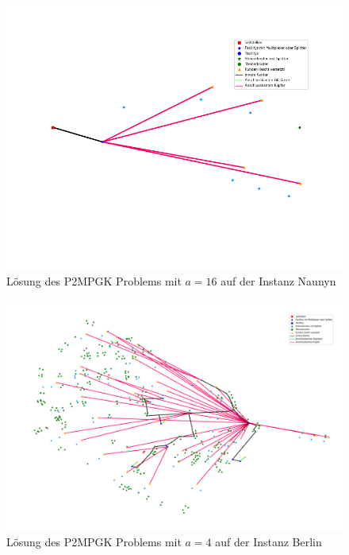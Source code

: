 \documentclass[11pt,a4paper]{article}
\theoremstyle{my_th_style1}
\begin{document}
\begin{figure}[!htbp]
	\begin{center}
		\begin{minipage}{15.0cm}
			\includegraphics[width=1\textwidth]{./Bilder/P2MPGK_Naunyn_demand1_duration0_SN16}
			\caption{L\"osung des P2MPGK Problems mit \(a = 16\) auf der Instanz Naunyn}
			\label{p2mpgk_n_pic_sn16}
		\end{minipage}
	\end{center}
\end{figure}

\begin{figure}[!htbp]
	\begin{center}
		\begin{minipage}{15.0cm}
			\includegraphics[width=1\textwidth]{./Bilder/P2MPGK_Berlin_demand1_duration0}
			\caption{L\"osung des P2MPGK Problems mit \(a = 4\) auf der Instanz Berlin}
			\label{p2mpgk_b_pic_sn4}
		\end{minipage}
	\end{center}
\end{figure}
\end{document}
